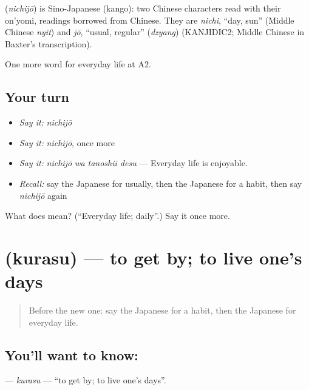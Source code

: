 \begin{cousinweb}
\textbf{} (\emph{nichijō}) is Sino-Japanese (kango): two Chinese characters read with their on'yomi, readings borrowed from Chinese. They are \emph{nichi}, \textquotedblleft{}day, sun\textquotedblright{} (Middle Chinese \emph{nyit}) and \emph{jō}, \textquotedblleft{}usual, regular\textquotedblright{} (\emph{dzyang}) (KANJIDIC2; Middle Chinese in Baxter's transcription).
\end{cousinweb}

\begin{grammarlens}[title={What you've built}]
One more word for everyday life at A2.
\end{grammarlens}

\subsection*{Your turn}
\begin{itemize}
\raggedright
  \item \emph{Say it:} \emph{nichijō}
  \item \emph{Say it:} \emph{nichijō}, once more
  \item \emph{Say it:} \emph{nichijō wa tanoshii desu} — Everyday life is enjoyable.
  \item \emph{Recall:} say the Japanese for usually, then the Japanese for a habit, then say \emph{nichijō} again
\end{itemize}

\begin{tcolorbox}[breakable,colback=teal!4,colframe=teal!35!black,title={Before you move on}]
What does  mean? (\textquotedblleft{}Everyday life; daily\textquotedblright{}.) Say it once more.
\end{tcolorbox}
\section[\texorpdfstring{\ja{くらす} (kurasu)}{くらす (kurasu)}]{ (kurasu) — to get by; to live one's days}

\label{lesson:JA-C154-kurasu}



\begin{quote}
Before the new one: say the Japanese for a habit, then the Japanese for everyday life.
\end{quote}

\subsection*{You'll want to know: }
\textbf{} — \emph{kurasu} — \textquotedblleft{}to get by; to live one's days\textquotedblright{}.

